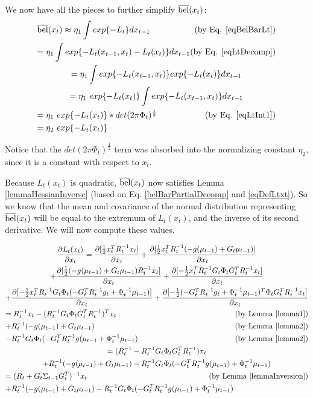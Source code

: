 We now have all the pieces to further simplify \(\overline{\mathrm{bel}}(x_t)\):
\begin{multline} \label{belBarPartialDecomp}
\overline{\bel}(x_t) \approx \eta_1 \int exp\{-L_t\}dx_{t-1} \hfill \text{(by Eq. \ref{eqBelBarLt})} \\
= \eta_1 \int exp\{-L_t(x_{t-1},x_t) - L_t(x_t)\}dx_{t-1} \hfill \text{(by Eq. \ref{eqLtDecomp})} \\
= \eta_1 \int exp\{-L_t(x_{t-1},x_t)\} exp \{ - L_t(x_t)\}dx_{t-1} \\
= \eta_1\ exp \{ - L_t(x_t)\} \int exp\{-L_t(x_{t-1},x_t)\} dx_{t-1} \\
= \eta_1\ exp \{ - L_t(x_t)\} * det(2 \pi \Phi_t)^{\frac{1}{2}} \hfill \text{(by Eq. \ref{eqLtInt1})} \\
= \eta_2\ exp \{ - L_t(x_t)\} \hfill
\end{multline}

Notice that the \(det(2 \pi \Phi_t)^{\frac{1}{2}}\) term was absorbed into the normalizing constant \(\eta_2\), since it is a constant with respect to \(x_t\).

Because \(L_t(x_t)\) is quadratic, \(\overline{\mathrm{bel}}(x_t)\) now satisfies Lemma \ref{lemmaHessianInverse} (based on Eq. \ref{belBarPartialDecomp} and \ref{eqDefLtxt}). So we know that the mean and covariance of the normal distribution representing \(\overline{\mathrm{bel}}(x_t)\) will be equal to the extremum of \(L_t(x_t)\), and the inverse of its second derivative. We will now compute these values.

\begin{multline*}
\frac{\partial L_t(x_t)}{\partial x_t} = \frac{\partial [\frac{1}{2} x_t^T R_t^{-1}x_t]}{\partial x_t} + \frac{\partial [\frac{1}{2} x_t^TR_t^{-1}(-g(\mu_{t-1})+G_t\mu_{t-1})]}{\partial x_t} \\
+ \frac{\partial [\frac{1}{2} (-g(\mu_{t-1})+G_t\mu_{t-1})R_t^{-1}x_t]}{\partial x_t} + \frac{\partial [-\frac{1}{2} x_t^TR_t^{-1}G_t\Phi_tG_t^TR_t^{-1}x_t]}{\partial x_t} \\
+ \frac{\partial [-\frac{1}{2} x_t^TR_t^{-1}G_t\Phi_t(-G_t^TR_t^{-1}g_t + \Phi_t^{-1}\mu_{t-1})]}{\partial x_t} + \frac{\partial [-\frac{1}{2} (-G_t^TR_t^{-1}g_t + \Phi_t^{-1}\mu_{t-1})^T\Phi_tG_t^TR_t^{-1}x_t]}{\partial x_t} \\
= R_t^{-1}x_t - (R_t^{-1}G_t\Phi_tG_t^TR_t^{-1})^Tx_t  \hfill \text{(by Lemma \ref{lemma1})} \\
+ R_t^{-1}(-g(\mu_{t-1}) + G_t\mu_{t-1}) \hfill \text{(by Lemma \ref{lemma2})} \\
-R_t^{-1}G_t\Phi_t(-G_t^TR_t^{-1}g(\mu_{t-1} + \Phi_t^{-1}\mu_{t-1}) \hfill \text{(by Lemma \ref{lemma2})} \\
= (R_t^{-1} - R_t^{-1}G_t\Phi_tG_t^TR_t^{-1})x_t \\
+ R_t^{-1}(-g(\mu_{t-1}) + G_t\mu_{t-1}) - R_t^{-1}G_t\Phi_t(-G_t^TR_t^{-1}g(\mu_{t-1}) + \Phi_t^{-1}\mu_{t-1}) \\
= (R_t + G_t\Sigma_{t-1}G_t^T)^{-1}x_t \hfill \text{(by Lemma \ref{lemmaInversion})} \\
+ R_t^{-1}(-g(\mu_{t-1}) + G_t\mu_{t-1}) - R_t^{-1}G_t\Phi_t(-G_t^TR_t^{-1}g(\mu_{t-1}) + \Phi_t^{-1}\mu_{t-1}) \hfill
\end{multline*}

